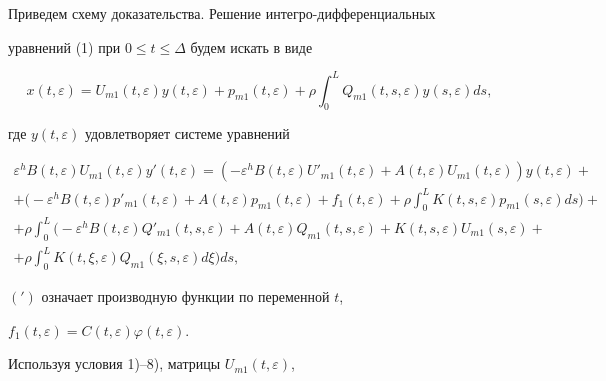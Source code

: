  


Приведем схему доказательства. Решение интегро-дифференциальных 


уравнений (1) при $0\le t\le\Delta$ будем искать в виде 


$$ 


x(t,\varepsilon)=U_{m1}(t,\varepsilon)y(t,\varepsilon)+ 


p_{m1}(t,\varepsilon)+\rho\int^L_0 Q_{m1}(t,s,\varepsilon) 


y(s,\varepsilon)ds, 


$$ 


где $y(t,\varepsilon)$ удовлетворяет системе уравнений 


\begin{gather*} 


\varepsilon^h B(t,\varepsilon)U_{m1}(t,\varepsilon) 


y'(t,\varepsilon)=(-\varepsilon^h B(t,\varepsilon) 


U'_{m1}(t,\varepsilon)+A(t,\varepsilon)U_{m1} 


(t,\varepsilon))y(t,\varepsilon)+ \\ 


% 


+\bigg(-\varepsilon^h B(t,\varepsilon)p'_{m1}(t,\varepsilon) 


+A(t,\varepsilon)p_{m1}(t,\varepsilon) 


+f_1(t,\varepsilon)+\rho\int^L_0 


K(t,s,\varepsilon)p_{m1}(s,\varepsilon)ds\bigg)+ \\ 


% 


+\rho\int^L_0\bigg(-\varepsilon^h B(t,\varepsilon) 


Q'_{m1}(t,s,\varepsilon)+A(t,\varepsilon) 


Q_{m1}(t,s,\varepsilon)+K(t,s,\varepsilon) 


U_{m1}(s,\varepsilon)+ \\ +\rho\int^L_0 


K(t,\xi,\varepsilon)Q_{m1}(\xi,s,\varepsilon)d\xi\bigg)ds, 


\end{gather*} 


$({}')$ означает производную функции по переменной $t$, 


$f_1(t,\varepsilon)=C(t,\varepsilon)\varphi(t,\varepsilon)$. 


 


Используя условия 1)--8), матрицы $U_{m1}(t,\varepsilon)$, 


